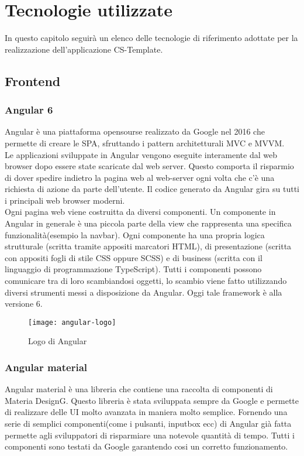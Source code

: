 
\chapter{Tecnologie utilizzate}
\label{cap:Tecnologie utilizzate}
In questo capitolo seguirà un elenco delle tecnologie di riferimento adottate per la realizzazione dell'applicazione CS-Template.
\section{Frontend}
\subsection{Angular 6}
Angular è una piattaforma opensourse realizzato da Google nel 2016 che permette di creare le SPA, sfruttando i
pattern architetturali MVC e MVVM.
\\

Le applicazioni sviluppate in Angular vengono eseguite interamente dal web browser dopo essere state scaricate dal web server. Questo comporta il risparmio di dover spedire indietro la pagina web al web-server ogni volta che c'è una richiesta di azione da parte dell'utente. Il codice generato da Angular gira su tutti i principali web browser moderni.
\\

Ogni pagina web viene costruitta da diversi componenti. Un componente in Angular in generale è una piccola parte della view che rappresenta una specifica funzionalità(esempio la navbar).   Ogni componente ha una propria logica
strutturale (scritta tramite appositi marcatori HTML), di presentazione (scritta con
appositi fogli di stile CSS oppure SCSS) e di business (scritta con il linguaggio di programmazione
TypeScript). Tutti i componenti possono comunicare tra di loro scambiandosi
oggetti, lo scambio viene fatto utilizzando diversi strumenti messi a disposizione da Angular. Oggi tale framework è alla versione 6.
\begin{figure}[!h] 
	\centering 
	\texttt{[image: angular-logo]} 
	\caption{Logo di Angular}
\end{figure}

\subsection{Angular material}
Angular material è una libreria che contiene una raccolta di componenti di Materia DesignG. Questo libreria è stata sviluppata sempre da Google e permette di realizzare delle UI molto avanzata in maniera molto semplice. Fornendo una serie di semplici componenti(come i pulsanti, inputbox ecc) di Angular già fatta permette agli sviluppatori di risparmiare una notevole quantità di tempo. Tutti i componenti sono testati da Google garantendo cosi un corretto funzionamento.

